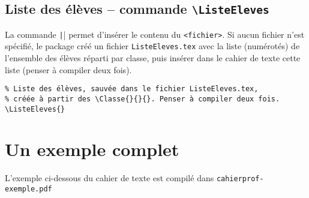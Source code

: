 \documentclass[a4paper,french,10pt]{article}
\begin{document}
\subsection{Liste des élèves -- commande \texttt{\textbackslash{}ListeEleves}}

La commande \texttt|| permet d'insérer le
contenu du \texttt{<fichier>}. Si aucun fichier n'est spécifié, le package créé
un fichier \texttt{ListeEleves.tex} avec la liste (numérotés) de l'ensemble des
élèves réparti par classe, puis insérer dans le cahier de texte cette liste
(penser à compiler deux fois).

\begin{verbatim}
% Liste des élèves, sauvée dans le fichier ListeEleves.tex,
% créée à partir des \Classe{}{}{}. Penser à compiler deux fois.
\ListeEleves{}
\end{verbatim}

\section{Un exemple complet}

L'exemple ci-dessous du cahier de texte est compilé dans
\texttt{cahierprof-exemple.pdf}

\inputminted{latex}{cahierprof-exemple.tex}
\end{document}
